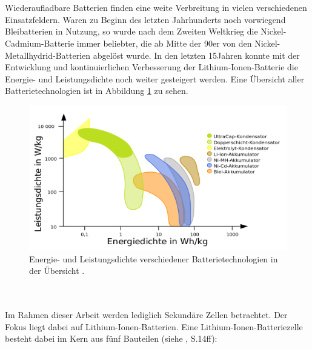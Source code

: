 \documentclass[a4paper, 11pt, headsepline,footsepline,twoside,abstract]{scrbook}
\begin{document}
\\\\
Wiederaufladbare Batterien finden eine weite Verbreitung in vielen verschiedenen Einsatzfeldern. Waren zu Beginn des letzten Jahrhunderts noch vorwiegend Bleibatterien in Nutzung, so wurde nach dem Zweiten Weltkrieg die Nickel-Cadmium-Batterie immer beliebter, die ab Mitte der 90er von den Nickel-Metallhydrid-Batterien abgelöst wurde. In den letzten 15\;Jahren konnte mit der Entwicklung und kontinuierlichen Verbesserung der Lithium-Ionen-Batterie die Energie- und Leistungsdichte noch weiter gesteigert werden. Eine Übersicht aller Batterietechnologien ist in Abbildung \ref{uebersicht_technologien} zu sehen.
\begin{figure}[]
	\centering
	\includegraphics[width=1\columnwidth]{images/Energiespeicher2.png}
	\caption{Energie- und Leistungsdichte verschiedener Batterietechnologien in der Übersicht \cite{wikimedia_energiespeicher}.}
	\label{uebersicht_technologien}
\end{figure}
\\\\
Im Rahmen dieser Arbeit werden lediglich Sekundäre Zellen betrachtet. Der Fokus liegt dabei auf Lithium-Ionen-Batterien. Eine Lithium-Ionen-Batteriezelle besteht dabei im Kern aus fünf Bauteilen (siehe \cite{korthauer2013}, S.14ff):
\end{document}
